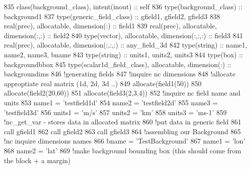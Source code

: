 \begin{DoxyCode}
835     \textcolor{keywordtype}{class}(background\_class), \textcolor{keywordtype}{intent(inout)} :: self
836     \textcolor{keywordtype}{type}(background\_class) :: background1
837     \textcolor{keywordtype}{type}(generic\_field\_class) :: gfield1, gfield2, gfield3
838     \textcolor{keywordtype}{real(prec)}, \textcolor{keywordtype}{allocatable}, \textcolor{keywordtype}{dimension(:)} :: field1
839     \textcolor{keywordtype}{real(prec)}, \textcolor{keywordtype}{allocatable}, \textcolor{keywordtype}{dimension(:,:)} :: field2
840     \textcolor{keywordtype}{type}(vector), \textcolor{keywordtype}{allocatable}, \textcolor{keywordtype}{dimension(:,:,:)} :: field3
841     \textcolor{keywordtype}{real(prec)}, \textcolor{keywordtype}{allocatable}, \textcolor{keywordtype}{dimension(:,:,:)} :: any\_field\_3d
842     \textcolor{keywordtype}{type}(string) :: name1, name2, name3, bname
843     \textcolor{keywordtype}{type}(string) :: units1, units2, units3
844     \textcolor{keywordtype}{type}(box) :: backgroundbbox
845     \textcolor{keywordtype}{type}(scalar1d\_field\_class), \textcolor{keywordtype}{allocatable}, \textcolor{keywordtype}{dimension(:)} :: backgroundims
846     \textcolor{comment}{!generating fields}
847     \textcolor{comment}{!inquire nc dimensions}
848     \textcolor{comment}{!allocate approptiate real matrix (1d, 2d, 3d ..)}
849     \textcolor{keyword}{allocate}(field1(50))
850     \textcolor{keyword}{allocate}(field2(20,60))
851     \textcolor{keyword}{allocate}(field3(2,3,4))
852     \textcolor{comment}{!inquire nc field name and units}
853     name1 = \textcolor{stringliteral}{'testfield1d'}
854     name2 = \textcolor{stringliteral}{'testfield2d'}
855     name3 = \textcolor{stringliteral}{'testfield3d'}
856     units1 = \textcolor{stringliteral}{'m/s'}
857     units2 = \textcolor{stringliteral}{'km'}
858     units3 = \textcolor{stringliteral}{'ms-1'}
859     \textcolor{comment}{!nc\_get\_var - stores data in allocated matrix}
860     \textcolor{comment}{!put data in generic field}
861     \textcolor{keyword}{call }gfield1%
862     \textcolor{keyword}{call }gfield2%
863     \textcolor{keyword}{call }gfield3%
864     \textcolor{comment}{!assembling our Background}
865     \textcolor{comment}{!nc inquire dimensions names}
866     bname = \textcolor{stringliteral}{'TestBackground'}
867     name1 = \textcolor{stringliteral}{'lon'}
868     name2 = \textcolor{stringliteral}{'lat'}
869     \textcolor{comment}{!make background bounding box (this should come from the block + a margin)}

\end{DoxyCode}
